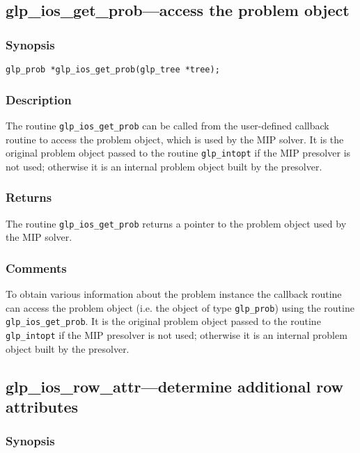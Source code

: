 \subsection{glp\_ios\_get\_prob---access the problem object}

\subsubsection*{Synopsis}

\begin{verbatim}
glp_prob *glp_ios_get_prob(glp_tree *tree);
\end{verbatim}

\subsubsection*{Description}

The routine \verb|glp_ios_get_prob| can be called from the user-defined
callback routine to access the problem object, which is used by the MIP
solver. It is the original problem object passed to the routine
\verb|glp_intopt| if the MIP presolver is not used; otherwise it is an
internal problem object built by the presolver.

\subsubsection*{Returns}

The routine \verb|glp_ios_get_prob| returns a pointer to the problem
object used by the MIP solver.

\subsubsection*{Comments}

To obtain various information about the problem instance the callback
routine can access the problem object (i.e. the object of type
\verb|glp_prob|) using the routine \verb|glp_ios_get_prob|. It is the
original problem object passed to the routine \verb|glp_intopt| if the
MIP presolver is not used; otherwise it is an internal problem object
built by the presolver.

\subsection{glp\_ios\_row\_attr---determine additional row attributes}

\subsubsection*{Synopsis}


